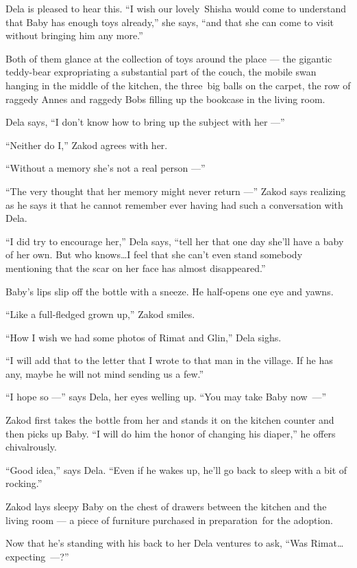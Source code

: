 \documentclass[twoside,11pt,openany]{book}
\begin{document}
Dela is pleased to hear this. ``I wish our lovely~Shisha would come to understand that Baby has enough toys already,''
she says,
``and that she can come to visit without bringing him any more.''

Both of them glance at the collection of toys around the place --- the gigantic teddy-bear expropriating a substantial
part of the couch, the mobile swan hanging in the middle of the kitchen, the three~big balls on the carpet, the row of
raggedy Annes and raggedy Bobs filling up the bookcase in the living room.

Dela says, ``I don't know how to bring up the subject with her ---''

``Neither do I,'' Zakod agrees with her.

``Without a memory she's not a real person ---''

``The very thought that her memory might never return ---'' Zakod says realizing as he says it
that he cannot remember ever having had such a conversation with Dela.

``I did try to encourage her,'' Dela says, ``tell her that one day she'll have a
baby of her own. But who knows{\ldots}I feel that she can't even stand somebody mentioning that the scar on her face has
almost disappeared.''

Baby's lips slip off the bottle with a sneeze. He half-opens one eye and yawns.

``Like a full-fledged grown up,'' Zakod smiles.

``How I wish we had some photos of Rimat and Glin,'' Dela sighs.

``I will add that to the letter that I wrote to that man in the village. If he has any, maybe he will not
mind sending us a few.''

``I hope so ---'' says Dela, her eyes welling up.
``You may take Baby now~---''

Zakod first takes the bottle from her and stands it on the kitchen counter and then picks up Baby. ``I
will do him the honor of changing his diaper,'' he offers chivalrously.

``Good idea,'' says Dela. ``Even if he wakes up, he'll go back to sleep with a
bit of rocking.''

Zakod lays sleepy Baby on the chest of drawers between the kitchen and the living room --- a piece of furniture purchased
in preparation~for the adoption.

Now that he's standing with his back to her Dela ventures to ask, ``Was Rimat{\ldots}expecting~---?''
\end{document}
